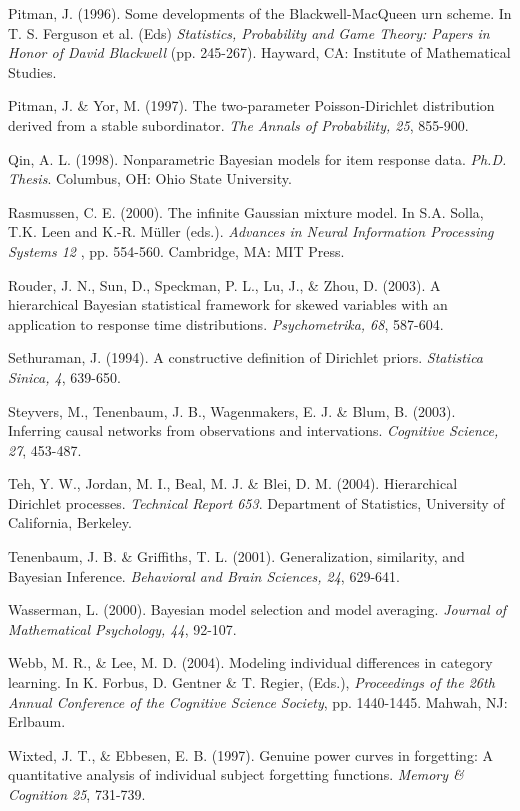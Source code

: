 \documentclass[authoryear]{elsarticle}
\begin{document}
\begin{list}{}{\setlength{\leftmargin}{12pt}\setlength{\itemindent}{-12pt}\setlength{\parsep}{0pt}}
\item Pitman, J. (1996). Some developments of the Blackwell-MacQueen urn scheme. In T. S. Ferguson et al. (Eds) {\it Statistics, Probability and Game Theory: Papers in Honor of David Blackwell} (pp. 245-267). Hayward, CA: Institute of Mathematical Studies.
\item Pitman, J. \& Yor, M. (1997). The two-parameter Poisson-Dirichlet distribution derived from a stable subordinator. {\it The Annals of Probability, 25}, 855-900.
\item Qin, A. L. (1998). Nonparametric Bayesian models for item response data. {\it Ph.D. Thesis}. Columbus, OH: Ohio State University.
\item Rasmussen, C. E. (2000). The infinite Gaussian mixture model. In S.A. Solla, T.K. Leen and K.-R. M\"{u}ller (eds.). {\it Advances in Neural Information Processing Systems 12} , pp. 554-560. Cambridge, MA: MIT Press.
\item Rouder, J. N., Sun, D., Speckman, P. L., Lu, J., \& Zhou, D. (2003). A hierarchical Bayesian statistical framework for skewed variables with an application to response time distributions. {\it Psychometrika, 68}, 587-604.
\item Sethuraman, J. (1994). A constructive definition of Dirichlet priors. {\it Statistica Sinica, 4}, 639-650.
\item Steyvers, M., Tenenbaum, J. B., Wagenmakers, E. J. \& Blum, B. (2003). Inferring causal networks from observations and  intervations. {\it Cognitive Science, 27}, 453-487.
\item Teh, Y. W., Jordan, M. I., Beal, M. J. \& Blei, D. M. (2004). Hierarchical Dirichlet processes. {\it Technical Report 653}. Department of Statistics, University of California, Berkeley.
\item Tenenbaum, J. B. \& Griffiths, T. L. (2001). Generalization, similarity, and Bayesian Inference. {\it Behavioral and Brain Sciences, 24}, 629-641.
\item Wasserman, L. (2000). Bayesian model selection and model averaging. {\it Journal of Mathematical Psychology, 44}, 92-107.
\item Webb, M. R., \& Lee, M. D. (2004). Modeling individual differences in category learning. In K. Forbus, D. Gentner \& T. Regier, (Eds.), {\it Proceedings of the 26th Annual Conference of the Cognitive Science Society}, pp. 1440-1445. Mahwah, NJ: Erlbaum.
\item Wixted, J. T., \& Ebbesen, E. B. (1997). Genuine power curves in forgetting: A quantitative analysis of individual subject forgetting functions. {\it Memory \& Cognition 25}, 731-739.
\end{list}
\normalsize
\end{document}
